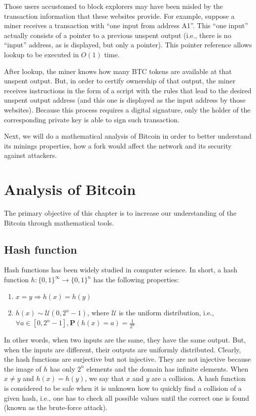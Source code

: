 Those users accustomed to block explorers may have been misled by the transaction information that these websites provide.  For example, suppose a miner receives a transaction with ``one input from address A1''.  This ``one input'' actually consists of a pointer to a previous unspent output (i.e., there is no ``input'' address, as is displayed, but only a pointer). This pointer reference allows lookup to be executed in $O(1)$ time.

After lookup, the miner knows how many BTC tokens are available at that unspent output.  But, in order to certify ownership of that output, the miner receives instructions in the form of a script with the rules that lead to the desired unspent output address (and this one is displayed as the input address by those websites). Because this process requires a digital signature, only the holder of the corresponding private key is able to sign such transaction.

Next, we will do a mathematical analysis of Bitcoin in order to better understand its minings properties, how a fork would affect the network and its security against attackers.

\chapter{Analysis of Bitcoin}

The primary objective of this chapter is to increase our understanding of the Bitcoin through mathematical tools.

\section{Hash function}

Hash functions has been widely studied in computer science. In short, a hash function $h: \{0, 1\}^\infty \rightarrow \{0, 1\}^{n}$ has the following properties:

\begin{enumerate}
	\item $x = y \Rightarrow h(x) = h(y)$
	\item $h(x) \sim \mathcal{U}(0, 2^{n}-1)$, where $\mathcal{U}$ is the uniform distribution, i.e., $\forall a \in [0, 2^{n}-1], \mathbf{P}(h(x)=a) = \frac{1}{2^{n}}$
\end{enumerate}

In other words, when two inputs are the same, they have the same output. But, when the inputs are different, their outputs are uniformly distributed. Clearly, the hash functions are surjective but not injective. They are not injective because the image of $h$ has only $2^n$ elements and the domain has infinite elements. When $x \ne y$ and $h(x) = h(y)$, we say that $x$ and $y$ are a collision. A hash function is considered to be safe when it is unknown how to quickly find a collision of a given hash, i.e., one has to check all possible values until the correct one is found (known as the brute-force attack).


